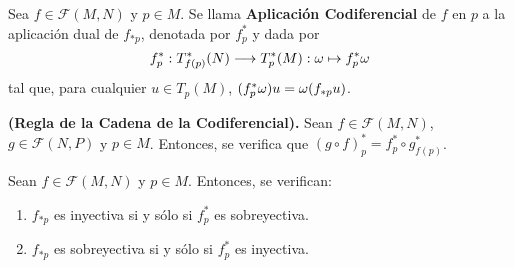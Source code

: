 \documentclass[cursovd_portada.tex]{subfiles}
\begin{document}
\begin{defi}
Sea $f\in\mathcal{F}(M,N)$ y $p\in M$. Se llama {\bf Aplicaci\'{o}n Co\-di\-fe\-ren\-cial} de $f$ en $p$ a la
aplicaci\'{o}n dual de $f_{*p}$, denotada por $f_p^*$ y dada por
$$f_p^*:T_{f(p)}^*(N)\longrightarrow T_p^*(M):\omega\mapsto f_p^*\omega$$
tal que, para cualquier $u\in T_p(M)$, $(f_p^*\omega)u=\omega(f_{*p}u)$.
\end{defi}
\begin{prop}
{\bf (Regla de la Cadena de la Codiferencial).} Sean $f\in\mathcal{F}(M,N)$, $g\in\mathcal{F}(N,P)$ y $p\in M$.
Entonces, se verifica que $(g\circ f)_p^*=f_p^*\circ g_{f(p)}^*$.
\end{prop}
\begin{prop}
Sean $f\in\mathcal{F}(M,N)$ y $p\in M$. Entonces, se verifican:
\begin{enumerate}
\item $f_{*p}$ es inyectiva si y s\'{o}lo si $f_p^*$ es sobreyectiva.
\item $f_{*p}$ es sobreyectiva si y s\'{o}lo si $f_p^*$ es inyectiva.
\end{enumerate}
\end{prop}

\newpage
\end{document}
